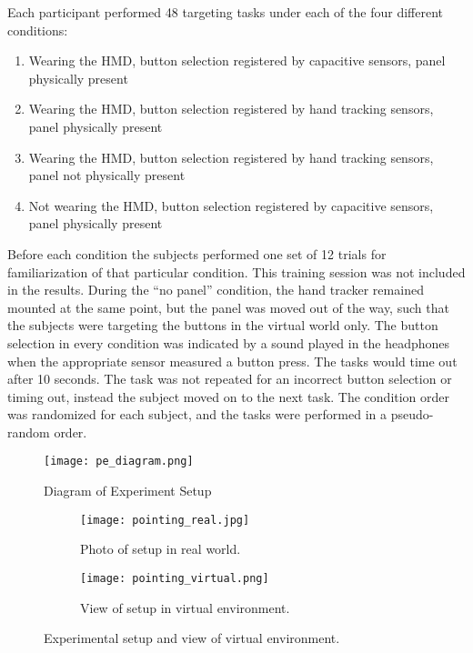 Each participant performed 48 targeting tasks under each of the four different conditions:
\begin{enumerate}
    \item Wearing the HMD, button selection registered by capacitive sensors, panel physically present
    \item Wearing the HMD, button selection registered by hand tracking sensors, panel physically present
    \item Wearing the HMD, button selection registered by hand tracking sensors, panel not physically present
    \item Not wearing the HMD, button selection registered by capacitive sensors, panel physically present
\end{enumerate}
Before each condition the subjects performed one set of 12 trials for familiarization of that particular condition.
This training session was not included in the results.
During the ``no panel'' condition, the hand tracker remained mounted at the same point, but the panel was moved out of the way, such that the subjects were targeting the buttons in the virtual world only.
The button selection in every condition was indicated by a sound played in the headphones when the appropriate sensor measured a button press.
The tasks would time out after 10 seconds.
The task was not repeated for an incorrect button selection or timing out, instead the subject moved on to the next task.
The condition order was randomized for each subject, and the tasks were performed in a pseudo-random order.

\begin{figure}
    \centering
    \texttt{[image: pe\_diagram.png]}
    \caption{Diagram of Experiment Setup}
    \label{fig:pe_diagram}
\end{figure}

\begin{figure}
    \centering
    \begin{subfigure}[t]{0.49\linewidth}
        \centering
        \texttt{[image: pointing\_real.jpg]}
        \caption{Photo of setup in real world.}
        \label{fig:p_setup:real}
    \end{subfigure}
    \begin{subfigure}[t]{0.49\linewidth}
        \centering
        \texttt{[image: pointing\_virtual.png]}
        \caption{View of setup in virtual environment.}
        \label{fig:p_setup:virtual}
    \end{subfigure}
    \caption{Experimental setup and view of virtual environment.}
    \label{fig:p_setup}
\end{figure}

